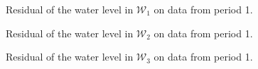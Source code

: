   \begin{figure}[H]
  \centering
   
  \vspace{-2.5mm}
  \caption{Residual of the water level in $\mathcal{W}_1$ on data from period 1.}
  \label{fig:residual_w1_p1}
  \end{figure}
 \vspace{-5mm}

  \begin{figure}[H]
  \centering
   
  \vspace{-2.5mm}
  \caption{Residual of the water level in $\mathcal{W}_2$ on data from period 1.}
  \label{fig:residual_w2_p1}
  \end{figure}
 \vspace{-5mm}

  \begin{figure}[H]
  \centering
   
  \vspace{-2.5mm}
  \caption{Residual of the water level in $\mathcal{W}_3$ on data from period 1.}
  \label{fig:residual_w3_p1}
  \end{figure}
 \vspace{-5mm}